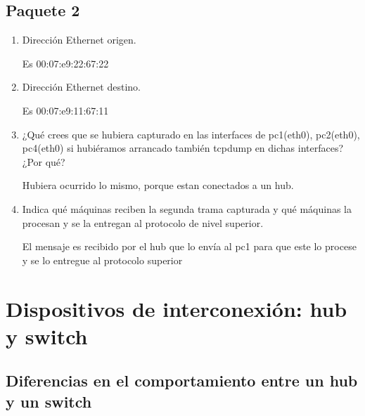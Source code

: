 \documentclass[12pt, a4paper]{report}
\begin{document}
\section{Paquete 2}
\begin{enumerate}[label=\alph*]
	\item Dirección Ethernet origen. 
	
	Es 00:07:e9:22:67:22
	\item Dirección Ethernet destino. 
	
	Es 00:07:e9:11:67:11
	\item ¿Qué crees que se hubiera capturado en las interfaces de pc1(eth0), pc2(eth0), pc4(eth0) si hubiéramos arrancado también tcpdump en dichas interfaces? ¿Por qué?
	
	Hubiera ocurrido lo mismo, porque estan conectados a un hub.
	\item Indica qué máquinas reciben la segunda trama capturada y qué máquinas la procesan y se la entregan
	al protocolo de nivel superior.
	
	El mensaje es recibido por el hub que lo envía al pc1 para que este lo procese y se lo entregue al protocolo superior
\end{enumerate}

\chapter{Dispositivos de interconexión: hub y switch}
\section{Diferencias en el comportamiento entre un hub y un switch}
\end{document}
